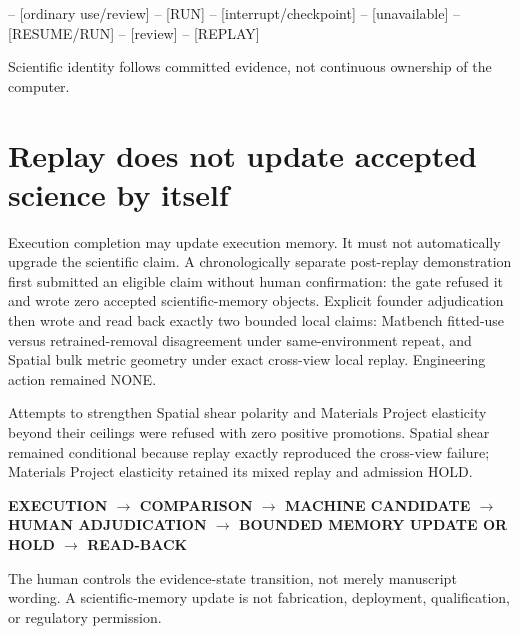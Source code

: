 \begin{center}\small\ttfamily
[RUN] -- [ordinary use/review] -- [RUN] -- [interrupt/checkpoint] -- [unavailable] -- [RESUME/RUN] -- [review] -- [REPLAY]
\end{center}
Scientific identity follows committed evidence, not continuous ownership of the computer.

\section{Replay does not update accepted science by itself}
Execution completion may update execution memory. It must not automatically upgrade the scientific claim. A chronologically separate post-replay demonstration first submitted an eligible claim without human confirmation: the gate refused it and wrote zero accepted scientific-memory objects. Explicit founder adjudication then wrote and read back exactly two bounded local claims: Matbench fitted-use versus retrained-removal disagreement under same-environment repeat, and Spatial bulk metric geometry under exact cross-view local replay. Engineering action remained NONE.

Attempts to strengthen Spatial shear polarity and Materials Project elasticity beyond their ceilings were refused with zero positive promotions. Spatial shear remained conditional because replay exactly reproduced the cross-view failure; Materials Project elasticity retained its mixed replay and admission HOLD.

\begin{center}\small\bfseries
EXECUTION $\rightarrow$ COMPARISON $\rightarrow$ MACHINE CANDIDATE $\rightarrow$ HUMAN ADJUDICATION $\rightarrow$ BOUNDED MEMORY UPDATE OR HOLD $\rightarrow$ READ-BACK
\end{center}
The human controls the evidence-state transition, not merely manuscript wording. A scientific-memory update is not fabrication, deployment, qualification, or regulatory permission.
